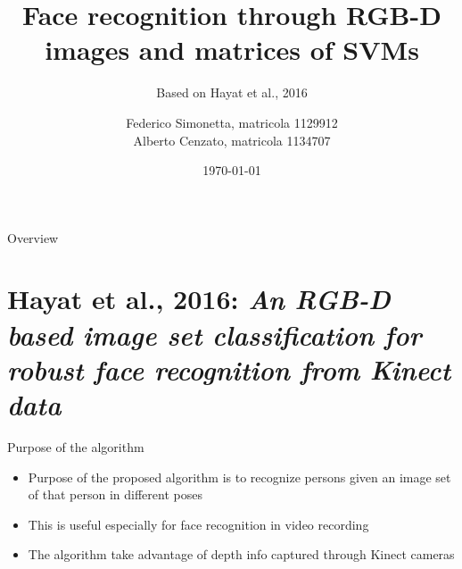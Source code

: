 \documentclass[unknownkeysallowed]{beamer}
\title{Face recognition through RGB-D images and matrices of SVMs} %
\subtitle{Based on Hayat et al., 2016}
\date{\today}
\author{Federico Simonetta, matricola 1129912 \\ Alberto Cenzato, matricola 1134707 }
\begin{document}
\maketitle
{}

\begin{frame}{Overview}
	\vspace*{6mm}
\end{frame}

\section{Hayat et al., 2016: \textit{An RGB-D based image set classification
for robust face recognition from Kinect data}}
\begin{frame}{Purpose of the algorithm}
	\begin{itemize}
		\item Purpose of the proposed algorithm is to recognize persons
			given an image set of that person in different poses
		\item This is useful especially for face recognition in video
			recording
		\item The algorithm take advantage of depth info captured
			through Kinect cameras
	\end{itemize}

\end{frame}
\end{document}

